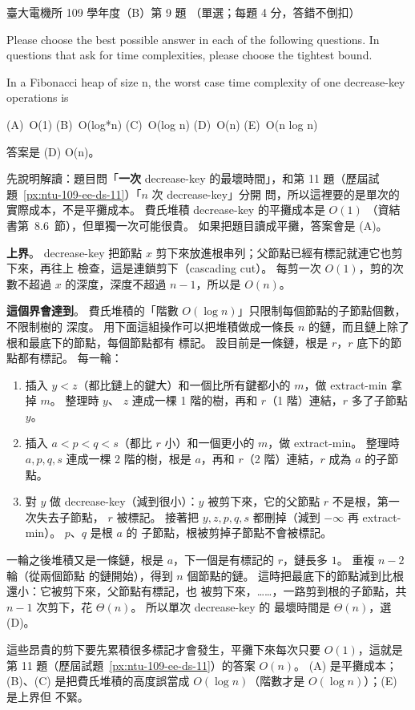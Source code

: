 \begin{pastexam}[label={px:ntu-109-ee-ds-09}]{臺大電機所 109 學年度（B）第 9 題}
（單選；每題 4 分，答錯不倒扣）

Please choose the best possible answer in each of the following questions. In questions that ask
for time complexities, please choose the tightest bound.

In a Fibonacci heap of size n, the worst case time complexity of one decrease-key operations is

(A)~O(1) \qquad (B)~O(log*n) \qquad (C)~O(log n) \qquad (D)~O(n) \qquad (E)~O(n log n)
\end{pastexam}

\begin{pastsoln}
答案是 (D) O(n)。

先說明解讀：題目問「\textbf{一次} decrease-key 的最壞時間」，和第 11 題（歷屆試題~\ref{px:ntu-109-ee-ds-11}）「$n$ 次 decrease-key」分開
問，所以這裡要的是單次的實際成本，不是平攤成本。 費氏堆積 decrease-key 的平攤成本是 $O(1)$
（資結書第~8.6~節），但單獨一次可能很貴。 如果把題目讀成平攤，答案會是 (A)。

\textbf{上界}。 decrease-key 把節點 $x$ 剪下來放進根串列；父節點已經有標記就連它也剪下來，再往上
檢查，這是連鎖剪下（cascading cut）。 每剪一次 $O(1)$，剪的次數不超過 $x$ 的深度，深度不超過
$n - 1$，所以是 $O(n)$。

\textbf{這個界會達到}。 費氏堆積的「階數 $O(\log n)$」只限制每個節點的子節點個數，不限制樹的
深度。 用下面這組操作可以把堆積做成一條長 $n$ 的鏈，而且鏈上除了根和最底下的節點，每個節點都有
標記。 設目前是一條鏈，根是 $r$，$r$ 底下的節點都有標記。 每一輪：
\begin{enumerate}
\item 插入 $y < z$（都比鏈上的鍵大）和一個比所有鍵都小的 $m$，做 extract-min 拿掉 $m$。 整理時 $y$、
$z$ 連成一棵 1 階的樹，再和 $r$（1 階）連結，$r$ 多了子節點 $y$。
\item 插入 $a < p < q < s$（都比 $r$ 小）和一個更小的 $m$，做 extract-min。 整理時 $a, p, q, s$ 連成一棵
2 階的樹，根是 $a$，再和 $r$（2 階）連結，$r$ 成為 $a$ 的子節點。
\item 對 $y$ 做 decrease-key（減到很小）：$y$ 被剪下來，它的父節點 $r$ 不是根，第一次失去子節點，
$r$ 被標記。 接著把 $y, z, p, q, s$ 都刪掉（減到 $-\infty$ 再 extract-min）。 $p$、$q$ 是根 $a$ 的
子節點，根被剪掉子節點不會被標記。
\end{enumerate}
一輪之後堆積又是一條鏈，根是 $a$，下一個是有標記的 $r$，鏈長多 $1$。 重複 $n - 2$ 輪（從兩個節點
的鏈開始），得到 $n$ 個節點的鏈。 這時把最底下的節點減到比根還小：它被剪下來，父節點有標記，也
被剪下來，……，一路剪到根的子節點，共 $n - 1$ 次剪下，花 $\Theta(n)$。 所以單次 decrease-key 的
最壞時間是 $\Theta(n)$，選 (D)。

這些昂貴的剪下要先累積很多標記才會發生，平攤下來每次只要 $O(1)$，這就是第 11 題（歷屆試題~\ref{px:ntu-109-ee-ds-11}）的答案 $O(n)$。
(A) 是平攤成本；(B)、(C) 是把費氏堆積的高度誤當成 $O(\log n)$（階數才是 $O(\log n)$）；(E) 是上界但
不緊。
\end{pastsoln}
